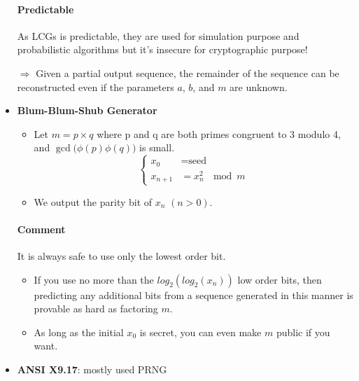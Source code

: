 \begin{itemize}
        \paragraph{Predictable}
        As LCGs is predictable, they are used for simulation purpose and probabilistic
        algorithms but it's insecure
        for cryptographic purpose!

        $\Rightarrow$ Given a partial output sequence, the remainder of
        the sequence can be reconstructed even if the parameters $a$, $b$,
        and $m$ are unknown.

    \item \textbf{Blum-Blum-Shub Generator}
        \begin{itemize}
            \item Let $m=p\times q$ where p and q are both primes congruent to 3 modulo
                4, and $ \gcd{\big(\phi(p)}{\phi(q)\big)} $ is small.
                $$\begin{cases}
                        x_0 & = \textrm{seed}\\
                        x_{n+1} & = x^2_n\ \mod{m}
                        \end{cases}$$
            \item We output the parity bit of $x_n$ $(n>0)$.
        \end{itemize}

        \paragraph{Comment}
        It is always safe to use only the lowest order bit. 
        \begin{itemize}
            \item If you use no more than the $log_2 (log_2 (x_n ))$ low order bits, then predicting
                any additional bits from a sequence generated in this manner is
                provable as hard as factoring $m$. 
            \item As long as the initial $x_0$ is secret,
                you can even make $m$ public if you want.
        \end{itemize}

    \item \textbf{ANSI X9.17}: mostly used PRNG 


\end{itemize}
